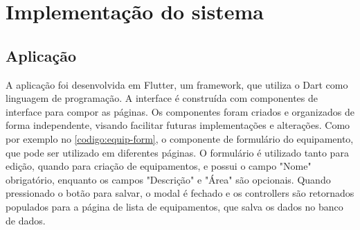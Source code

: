 \section{Implementação do sistema}\label{sec:implementacaoSistema}


\subsection{Aplicação}\label{subsec:aplicacao}
A aplicação foi desenvolvida em Flutter, um framework, que utiliza o Dart como linguagem de programação. A interface é construída com componentes de interface para compor as páginas. Os componentes foram criados e organizados de forma independente, visando facilitar futuras implementações e alterações. Como por exemplo no \autoref{codigo:equip-form}, o componente de formulário do equipamento, que pode ser utilizado em diferentes páginas. O formulário é utilizado tanto para edição, quando para criação de equipamentos, e possui o campo "Nome" obrigatório, enquanto os campos "Descrição" e "Área" são opcionais. Quando pressionado o botão para salvar, o modal é fechado e os controllers são retornados populados para a página de lista de equipamentos, que salva os dados no banco de dados.

